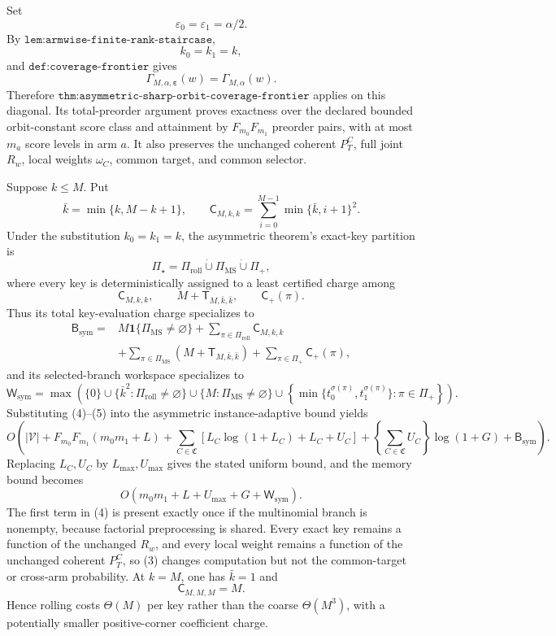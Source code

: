 Set
\[
\varepsilon_0=\varepsilon_1=\alpha/2.
\]
By \(\texttt{lem:armwise-finite-rank-staircase}\),
\[
k_0=k_1=k,
\]
and \(\texttt{def:coverage-frontier}\) gives
\[
\Gamma_{M,\alpha,\boldsymbol\varepsilon}(w)=\Gamma_{M,\alpha}(w).
\tag{1}
\]
Therefore \(\texttt{thm:asymmetric-sharp-orbit-coverage-frontier}\) applies on this diagonal. Its total-preorder argument proves exactness over the declared bounded orbit-constant score class and attainment by \(F_{m_0}F_{m_1}\) preorder pairs, with at most \(m_a\) score levels in arm \(a\). It also preserves the unchanged coherent \(P_T^C\), full joint \(R_w\), local weights \(\omega_C\), common target, and common selector.

Suppose \(k\le M\). Put
\[
\bar k=\min\{k,M-k+1\},\qquad
\mathsf C_{M,k,k}
 =\sum_{i=0}^{M-1}\min\{\bar k,i+1\}^2.
\tag{2}
\]
Under the substitution \(k_0=k_1=k\), the asymmetric theorem's exact-key partition is
\[
\Pi_\star
 =\Pi_{\mathrm{roll}}\mathbin{\dot\cup}\Pi_{\mathrm{MS}}\mathbin{\dot\cup}\Pi_+,
\tag{3}
\]
where every key is deterministically assigned to a least certified charge among
\[
\mathsf C_{M,k,k},\qquad
M+\mathsf T_{M,\bar k,\bar k},\qquad
\mathsf C_+(\pi).
\]
Thus its total key-evaluation charge specializes to
\[
\begin{aligned}
\mathsf B_{\mathrm{sym}}={}&
M\mathbf 1\{\Pi_{\mathrm{MS}}\ne\varnothing\}
+\sum_{\pi\in\Pi_{\mathrm{roll}}}\mathsf C_{M,k,k}\\
&+\sum_{\pi\in\Pi_{\mathrm{MS}}}
 \left(M+\mathsf T_{M,\bar k,\bar k}\right)
+\sum_{\pi\in\Pi_+}\mathsf C_+(\pi),
\end{aligned}
\tag{4}
\]
and its selected-branch workspace specializes to
\[
\mathsf W_{\mathrm{sym}}
=\max\!\left(
\{0\}
\cup\{\bar k^2:\Pi_{\mathrm{roll}}\ne\varnothing\}
\cup\{M:\Pi_{\mathrm{MS}}\ne\varnothing\}
\cup\left\{\min\{t_0^{\sigma(\pi)},t_1^{\sigma(\pi)}\}:\pi\in\Pi_+\right\}
\right).
\tag{5}
\]
Substituting (4)--(5) into the asymmetric instance-adaptive bound yields
\[
O\!\left(
|\mathcal V|+F_{m_0}F_{m_1}(m_0m_1+L)
+\sum_{C\in\mathfrak C}\!\left[L_C\log(1+L_C)+L_C+U_C\right]
+\left\{\sum_{C\in\mathfrak C}U_C\right\}\log(1+G)
+\mathsf B_{\mathrm{sym}}
\right).
\tag{6}
\]
Replacing \(L_C,U_C\) by \(L_{\max},U_{\max}\) gives the stated uniform bound, and the memory bound becomes
\[
O(m_0m_1+L+U_{\max}+G+\mathsf W_{\mathrm{sym}}).
\tag{7}
\]
The first term in (4) is present exactly once if the multinomial branch is nonempty, because factorial preprocessing is shared. Every exact key remains a function of the unchanged \(R_w\), and every local weight remains a function of the unchanged coherent \(P_T^C\), so (3) changes computation but not the common-target or cross-arm probability. At \(k=M\), one has \(\bar k=1\) and
\[
\mathsf C_{M,M,M}=M.
\]
Hence rolling costs \(\Theta(M)\) per key rather than the coarse \(\Theta(M^3)\), with a potentially smaller positive-corner coefficient charge.

